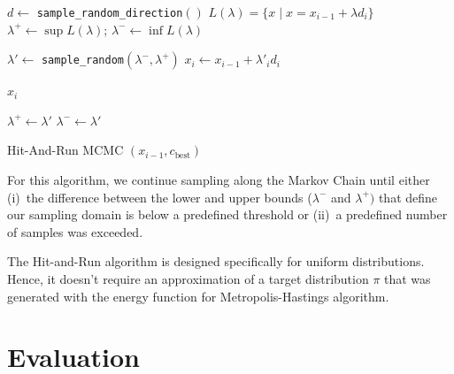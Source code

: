 \documentclass[letterpaper, 10 pt, conference]{ieeeconf}  %
\begin{document}
\begin{algorithm}[t]
	\begin{algorithmic}[1]
		\STATE $d \leftarrow$ \texttt{sample\_random\_direction}$()$
		\STATE $ L(\lambda) = \{  x \mid x = x_{i-1} + \lambda d_i \} $
		\STATE $ \lambda^{+} \leftarrow \sup L(\lambda) $; 
		\hspace{3mm} 
		$ \lambda^{-} \leftarrow \inf L(\lambda) $
		
		\LOOP
		
		
		\STATE $ \lambda' \leftarrow$ \texttt{sample\_random}$ (\lambda^{-} , \lambda^{+})$
		\STATE $ x_{i} \leftarrow x_{i-1} + \lambda'_{i} d_i $
		
		\RETURN $ x_{i}$
		\ENDIF
		
		
		\STATE $ \lambda^{+} \leftarrow \lambda' $
		\ELSE
		\STATE $ \lambda^{-} \leftarrow \lambda'$
		\ENDIF
		
		\ENDLOOP
	\end{algorithmic}
	\caption{Hit-And-Run MCMC $(x_{i-1}, c_{\text{best}})$}
	\label{alg:hit_and_run_mcmc}	
\end{algorithm}

For this algorithm, we continue sampling along the Markov Chain until either 
(i)~the difference between the lower and upper bounds ($\lambda^-$ and $\lambda^+)$ 
that define our sampling domain is below a predefined threshold or
(ii)~a predefined number of samples was exceeded.

The Hit-and-Run algorithm is designed specifically for uniform distributions. 
Hence, it doesn't require an approximation of a target distribution $ \pi $ that was generated with the energy function for Metropolis-Hastings algorithm.

\section{Evaluation}
\label{sec:eval}


\end{document}
